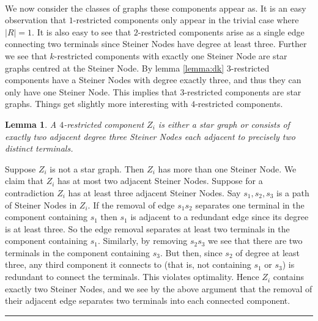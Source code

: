 \documentclass[letterpaper,12pt,oneside,onecolumn]{article}
\newenvironment{proof}{{\bf Proof:  }}{\hfill\rule{2mm}{2mm}}
\newtheorem{lemma}[fact]{Lemma}
\begin{document}
\paragraph{}
We now consider the classes of graphs these components appear as. It is an easy observation that $1$-restricted components only appear in the trivial case where $|R| = 1$. It is also easy to see that $2$-restricted components arise as a single edge connecting two terminals since Steiner Nodes have degree at least three. Further we see that $k$-restricted components with exactly one Steiner Node are star graphs centred at the Steiner Node. By lemma \ref{lemma:dk} $3$-restricted components have a Steiner Nodes with degree exactly three, and thus they can only have one Steiner Node. This implies that $3$-restricted components are star graphs. Things get slightly more interesting with $4$-restricted components.
\begin{lemma}\label{lemma:four}
A $4$-restricted component $Z_i$ is either a star graph or consists of exactly two adjacent degree three Steiner Nodes each adjacent to precisely two distinct terminals.
\end{lemma}
\begin{proof}
Suppose $Z_i$ is not a star graph. Then $Z_i$ has more than one Steiner Node. We claim that $Z_i$ has at most two adjacent Steiner Nodes. Suppose for a contradiction $Z_i$ has at least three adjacent Steiner Nodes. Say $s_1,s_2,s_3$ is a path of Steiner Nodes in $Z_i$. If the removal of edge $s_1s_2$ separates one terminal in the component containing $s_1$ then $s_1$ is adjacent to a redundant edge since its degree is at least three. So the edge removal separates at least two terminals in the component containing $s_1$. Similarly, by removing $s_2s_3$ we see that there are two terminals in the component containing $s_3$. But then, since $s_2$ of degree at least three, any third component it connects to (that is, not containing $s_1$ or $s_3$) is redundant to connect the terminals. This violates optimality. Hence $Z_i$ contains exactly two Steiner Nodes, and we see by the above argument that the removal of their adjacent edge separates two terminals into each connected component.
\end{proof}
\end{document}
